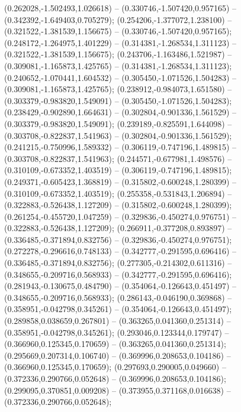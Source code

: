  (0.262028,-1.502493,1.026618) -- (0.330746,-1.507420,0.957165) -- (0.342392,-1.649403,0.705279);
 (0.254206,-1.377072,1.238100) -- (0.321522,-1.381539,1.156675) -- (0.330746,-1.507420,0.957165);
 (0.248172,-1.264975,1.401229) -- (0.314381,-1.268534,1.311123) -- (0.321522,-1.381539,1.156675);
 (0.243706,-1.163486,1.521987) -- (0.309081,-1.165873,1.425765) -- (0.314381,-1.268534,1.311123);
 (0.240652,-1.070441,1.604532) -- (0.305450,-1.071526,1.504283) -- (0.309081,-1.165873,1.425765);
 (0.238912,-0.984073,1.651580) -- (0.303379,-0.983820,1.549091) -- (0.305450,-1.071526,1.504283);
 (0.238429,-0.902890,1.664631) -- (0.302804,-0.901336,1.561529) -- (0.303379,-0.983820,1.549091);
 (0.239189,-0.825591,1.644098) -- (0.303708,-0.822837,1.541963) -- (0.302804,-0.901336,1.561529);
 (0.241215,-0.750996,1.589332) -- (0.306119,-0.747196,1.489815) -- (0.303708,-0.822837,1.541963);
 (0.244571,-0.677981,1.498576) -- (0.310109,-0.673352,1.403519) -- (0.306119,-0.747196,1.489815);
 (0.249371,-0.605423,1.368819) -- (0.315802,-0.600248,1.280399) -- (0.310109,-0.673352,1.403519);
 (0.255358,-0.531843,1.206894) -- (0.322883,-0.526438,1.127209) -- (0.315802,-0.600248,1.280399);
 (0.261254,-0.455720,1.047259) -- (0.329836,-0.450274,0.976751) -- (0.322883,-0.526438,1.127209);
 (0.266911,-0.377208,0.893897) -- (0.336485,-0.371894,0.832756) -- (0.329836,-0.450274,0.976751);
 (0.272278,-0.296616,0.748133) -- (0.342777,-0.291595,0.696416) -- (0.336485,-0.371894,0.832756);
 (0.277305,-0.214302,0.611316) -- (0.348655,-0.209716,0.568933) -- (0.342777,-0.291595,0.696416);
 (0.281943,-0.130675,0.484790) -- (0.354064,-0.126643,0.451497) -- (0.348655,-0.209716,0.568933);
 (0.286143,-0.046190,0.369868) -- (0.358951,-0.042798,0.345261) -- (0.354064,-0.126643,0.451497);
 (0.289858,0.038659,0.267801) -- (0.363265,0.041360,0.251314) -- (0.358951,-0.042798,0.345261);
 (0.293046,0.123344,0.179747) -- (0.366960,0.125345,0.170659) -- (0.363265,0.041360,0.251314);
 (0.295669,0.207314,0.106740) -- (0.369996,0.208653,0.104186) -- (0.366960,0.125345,0.170659);
 (0.297693,0.290005,0.049660) -- (0.372336,0.290766,0.052648) -- (0.369996,0.208653,0.104186);
 (0.299095,0.370851,0.009208) -- (0.373955,0.371168,0.016638) -- (0.372336,0.290766,0.052648);
